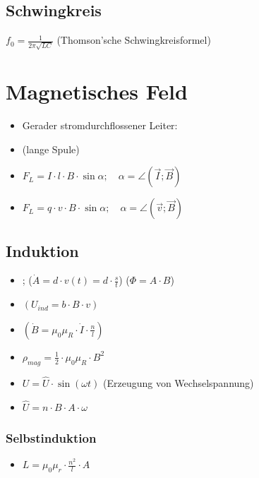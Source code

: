 \documentclass[paper = a4, twocolumn]{scrartcl}
\DeclareRobustCommand{\E}{\mathcal{E}}
\begin{document}
\subsection{Schwingkreis}
\( f_0 = \frac{1}{2 \pi \sqrt{LC}} \) (Thomson’sche Schwingkreisformel)

\section{Magnetisches Feld}
\begin{itemize}
\item
	Gerader stromdurchflossener Leiter:\\
\item
	 (lange Spule)
\item
	\( F_L = I \cdot l \cdot B \cdot \sin \alpha; \quad \alpha =
	\angle(\vec{I}; \vec{B}) \)
\item
	\( F_L =  q \cdot v \cdot B \cdot \sin \alpha; \quad \alpha =
	\angle(\vec{v}; \vec{B}) \)
\end{itemize}

\subsection{Induktion}
\begin{itemize}
\item
	; \quad (\(
	\dot{A} = d \cdot v(t) = d \cdot \frac{s}{t} \)) (\( \Phi = A \cdot B \))
\item
	\(\left(  U_{ind} = b \cdot B \cdot v \right)\)
\item
	\( \left( \dot{B} = \mu_0 \mu_R \cdot \dot{I} \cdot \frac{n}{l} \right) \)
\itemb{
	\( \E_{mag} = \frac{1}{2} \cdot L \cdot I^2 \)
}
\item
	\( \rho_{mag} = \frac{1}{2} \cdot \mu_0 \mu_R \cdot B^2 \)
\item
	\( U = \hat{U} \cdot \sin(\omega t) \) (Erzeugung von Wechselspannung)
\item
	\( \hat{U} = n \cdot B \cdot A \cdot \omega \)
\end{itemize}

\subsubsection{Selbstinduktion}
\begin{itemize}
\item{
	\( L = \mu_0 \mu_r \cdot \frac{n^2}{l} \cdot A \)
}
\end{itemize}
\end{document}
